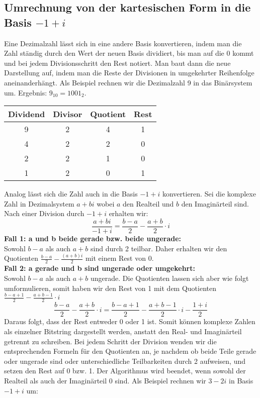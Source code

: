 \documentclass[course=erap]{aspdoc}
\begin{document}
\subsection{Umrechnung von der kartesischen Form in die Basis $-1 + i$\cite{CtoBNaive}} 
Eine Dezimalzahl lässt sich in eine andere Basis konvertieren, indem man die Zahl ständig durch den Wert der neuen Basis dividiert, bis man auf die 0 kommt und bei jedem Divisionsschritt den Rest notiert. Man baut dann die neue Darstellung auf, indem man die Reste der Divisionen in umgekehrter Reihenfolge aneinanderhängt. Als Beispiel rechnen wir die Dezimalzahl 9 in das Binärsystem um. Ergebnis: $9_{10} = 1001_2$.
\begin{center}
    \begin{tabular}{||c|c|c| c||}
    \hline
    Dividend & Divisor & Quotient & Rest\\
    \hline
    9 & 2  & 4  & 1\\
    \hline
    4 & 2  & 2  & 0\\
    \hline
    2 & 2  & 1  & 0\\
    \hline
    1 & 2  & 0  & 1\\
    \hline
    \end{tabular}
\end{center}
Analog lässt sich die Zahl auch in die Basis $-1 + i$ konvertieren. 
Sei die komplexe Zahl in Dezimalsystem $a + bi$ wobei $a$ den Realteil und $b$ den Imaginärteil sind. Nach einer Division durch $-1 + i$ erhalten wir:
$$\frac{a + bi}{-1 + i} = \frac{b-a}{2} - \frac{a + b}{2}\cdot i $$
\textbf{Fall 1: a und b beide gerade bzw. beide ungerade:}\\
Sowohl $b - a$ als auch $a + b$ sind durch 2 teilbar. Daher erhalten wir den Quotienten $\frac{b-a}{2} - \frac{(a + b)i}{2}$ mit einem Rest von 0.\\
\textbf{Fall 2: a gerade und b sind ungerade oder umgekehrt: }\\
Sowohl $b - a$ als auch $a + b$ ungerade. Die Quotienten lassen sich aber wie folgt umformulieren, somit haben wir den Rest von 1 mit dem Quotienten $\frac{b-a +1}{2} - \frac{a + b - 1}{2} \cdot i$
$$\frac{b-a}{2} - \frac{a + b}{2}\cdot i  = \frac{b-a +1}{2} - \frac{a + b - 1}{2} \cdot i -\frac{1 + i}{2}$$
Daraus folgt, dass der Rest entweder 0 oder 1 ist. Somit können komplexe Zahlen als einzelner Bitstring dargestellt werden, anstatt den Real- und Imaginärteil getrennt zu schreiben. Bei jedem Schritt der Division wenden wir die entsprechenden Formeln für den Quotienten an, je nachdem ob beide Teile gerade oder ungerade sind oder unterschiedliche Teilbarkeiten durch 2 aufweisen, und setzen den Rest auf 0 bzw. 1. Der Algorithmus wird beendet, wenn sowohl der Realteil als auch der Imaginärteil 0 sind. Als Beispiel rechnen wir $3 - 2i$ in  Basis $-1 + i$ um:
\end{document}
